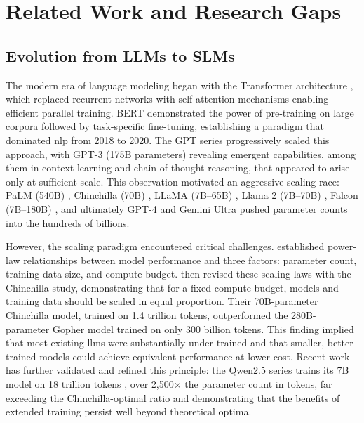 \section{Related Work and Research Gaps}
\label{section:background}

\subsection{Evolution from LLMs to SLMs}
\label{subsec:background_evolution}
The modern era of language modeling began with the Transformer architecture \citep{vaswani2017attention}, which replaced recurrent networks with self-attention mechanisms enabling efficient parallel training. BERT \citep{devlin2019bert} demonstrated the power of pre-training on large corpora followed by task-specific fine-tuning, establishing a paradigm that dominated \gls{nlp} from 2018 to 2020. The GPT series \citep{brown2020gpt3,radford2019gpt2,openai2023gpt4} progressively scaled this approach, with GPT-3 (175B parameters) revealing emergent capabilities, among them in-context learning and chain-of-thought reasoning, that appeared to arise only at sufficient scale. This observation motivated an aggressive scaling race: PaLM (540B) \citep{chowdhery2023palm}, Chinchilla (70B) \citep{hoffmann2022chinchilla}, LLaMA (7B--65B) \citep{touvron2023llama}, Llama 2 (7B--70B) \citep{touvron2023llama2}, Falcon (7B--180B) \citep{almazrouei2023falcon}, and ultimately GPT-4 \citep{openai2023gpt4} and Gemini Ultra \citep{gemini2023} pushed parameter counts into the hundreds of billions.

However, the scaling paradigm encountered critical challenges. \citet{kaplan2020scaling} established power-law relationships between model performance and three factors: parameter count, training data size, and compute budget. \citet{hoffmann2022chinchilla} then revised these scaling laws with the Chinchilla study, demonstrating that for a fixed compute budget, models and training data should be scaled in equal proportion. Their 70B-parameter Chinchilla model, trained on 1.4 trillion tokens, outperformed the 280B-parameter Gopher model trained on only 300 billion tokens. This finding implied that most existing \glspl{llm} were substantially under-trained and that smaller, better-trained models could achieve equivalent performance at lower cost. Recent work has further validated and refined this principle: the Qwen2.5 series trains its 7B model on 18 trillion tokens \citep{qwen2024qwen25}, over 2,500$\times$ the parameter count in tokens, far exceeding the Chinchilla-optimal ratio and demonstrating that the benefits of extended training persist well beyond theoretical optima.

